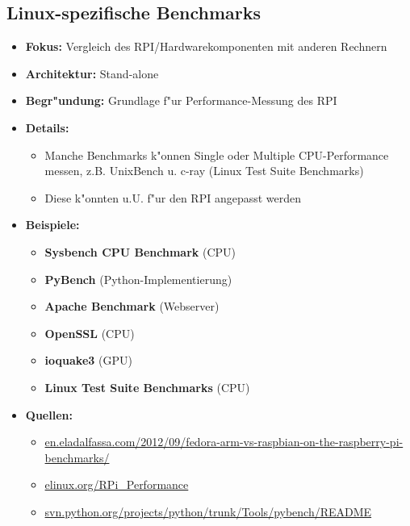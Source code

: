 \documentclass{scrartcl}
\begin{document}
\subsection{Linux-spezifische Benchmarks} 
\begin{itemize}
	\item \textbf{Fokus:} Vergleich des RPI/Hardwarekomponenten mit anderen Rechnern 
	\item \textbf{Architektur:} Stand-alone
	\item \textbf{Begr"undung:} Grundlage f"ur Performance-Messung des RPI 
	\item \textbf{Details:} 
	\begin{itemize}
		\item Manche Benchmarks k"onnen Single oder Multiple CPU-Performance messen, z.B. UnixBench u. c-ray (Linux Test Suite Benchmarks)
		\item Diese k"onnten u.U. f"ur den RPI angepasst werden 
	\end{itemize}		
	\item \textbf{Beispiele:}
	\begin{itemize} 
		\item \textbf{Sysbench CPU Benchmark} (CPU) 
		\item \textbf{PyBench} (Python-Implementierung)
		\item \textbf{Apache Benchmark} (Webserver)
		\item \textbf{OpenSSL} (CPU)
		\item \textbf{ioquake3} (GPU)
		\item \textbf{Linux Test Suite Benchmarks} (CPU) 
	\end{itemize}	
	\item \textbf{Quellen:}
	\begin{itemize}
		\item \uline{en.eladalfassa.com/2012/09/fedora-arm-vs-raspbian-on-the-raspberry-pi-benchmarks/}
		\item \uline{elinux.org/RPi\_Performance}
		\item \uline{svn.python.org/projects/python/trunk/Tools/pybench/README}
	\end{itemize}
\end{itemize} 
\end{document}
